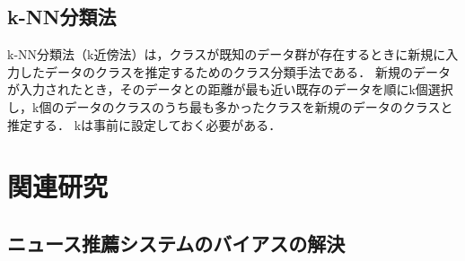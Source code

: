 \documentclass[12pt,a4j]{jreport}
\begin{document}



\section{k-NN分類法}
k-NN分類法（k近傍法）は，クラスが既知のデータ群が存在するときに新規に入力したデータのクラスを推定するためのクラス分類手法である\cite{aurellen20}．
新規のデータが入力されたとき，そのデータとの距離が最も近い既存のデータを順にk個選択し，k個のデータのクラスのうち最も多かったクラスを新規のデータのクラスと推定する．
kは事前に設定しておく必要がある．


\chapter{関連研究}


\section{ニュース推薦システムのバイアスの解決}
~
\end{document}
